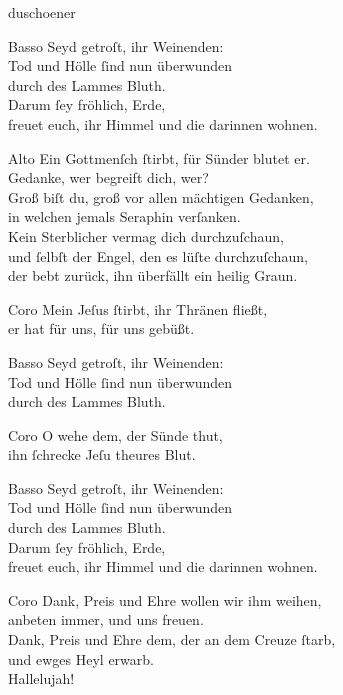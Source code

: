 \documentclass[shorttitlesize=55,tocstyle=ref-genre]{ees}
\begin{document}
{\begin{movement}{duschoener}
  \item[Basso]
  Seyd getroſt, ihr Weinenden:\\
  Tod und Hölle ſind nun überwunden\\
  durch des Lammes Bluth.\\
  Darum ſey fröhlich, Erde,\\
  freuet euch, ihr Himmel und die darinnen wohnen.

  \item[Alto]
  Ein Gottmenſch ſtirbt, für Sünder blutet er.\\
  Gedanke, wer begreift dich, wer?\\
  Groß biſt du, groß vor allen mächtigen Gedanken,\\
  in welchen jemals Seraphin verſanken.\\
  Kein Sterblicher vermag dich durchzuſchaun,\\
  und ſelbſt der Engel, den es lüſte durchzuſchaun,\\
  der bebt zurück, ihn überfällt ein heilig Graun.

  \item[Coro]
  Mein Jeſus ſtirbt, ihr Thränen fließt,\\
  er hat für uns, für uns gebüßt.

  \item[Basso]
  Seyd getroſt, ihr Weinenden:\\
  Tod und Hölle ſind nun überwunden\\
  durch des Lammes Bluth.

  \item[Coro]
  O wehe dem, der Sünde thut,\\
  ihn ſchrecke Jeſu theures Blut.

  \item[Basso]
  Seyd getroſt, ihr Weinenden:\\
  Tod und Hölle ſind nun überwunden\\
  durch des Lammes Bluth.\\
  Darum ſey fröhlich, Erde,\\
  freuet euch, ihr Himmel und die darinnen wohnen.

  \item[Coro]
  Dank, Preis und Ehre wollen wir ihm weihen,\\
  anbeten immer, und uns freuen.\\
  Dank, Preis und Ehre dem, der an dem Creuze ſtarb,\\
  und ewges Heyl erwarb.\\
  Hallelujah!
\end{movement}

}
\end{document}
